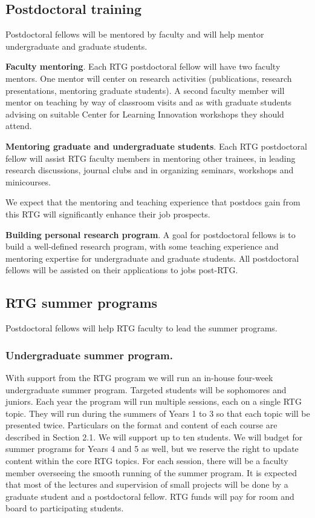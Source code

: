 \documentclass[11pt]{NSFamsart}
\begin{document}
\subsection{Postdoctoral training}
 Postdoctoral fellows will be mentored by faculty 
 and will help mentor undergraduate and graduate students. 


\noindent
\textbf{Faculty mentoring}. Each RTG postdoctoral fellow will have two faculty mentors. One mentor will center on research activities
(publications, research presentations, mentoring graduate students). A second faculty member will
mentor on teaching by way of classroom visits and as with graduate students advising on suitable Center for Learning Innovation workshops they should attend. 

\noindent
\textbf{Mentoring graduate  and undergraduate students}. Each RTG postdoctoral fellow will assist RTG faculty members in mentoring 
other trainees, in leading research discussions, journal clubs and
in organizing seminars, workshops and minicourses. 
 
We expect that the mentoring and teaching experience that postdocs gain from this RTG will significantly enhance their job prospects.   

 
 \noindent
\textbf{Building personal research program}. A goal for postdoctoral fellows is to   build a well-defined research program, with some teaching experience and mentoring expertise for undergraduate and graduate students.  All postdoctoral fellows will be assisted on their applications to jobs post-RTG.


\subsection{RTG summer programs}
 
Postdoctoral fellows will help RTG faculty to lead the   summer programs.

 \noindent
\subsubsection*{Undergraduate summer program.}
With support from the RTG program we will run an in-house four-week undergraduate summer program.
Targeted students will be sophomores and juniors. Each year the program will run multiple sessions, each on a single RTG topic. They will run during the summers of Years 1 to 3 so that each topic
will be presented twice. Particulars on the format and content of each course are described in Section 2.1.
We will support up to ten students. We will budget for summer programs for Years 4 and 5 as well, but we reserve
the right to update content within the core RTG topics. For each session, there will be a faculty member
  overseeing the smooth running of the summer program. It is expected that most of the lectures
and supervision of small projects will be done by a graduate student and a postdoctoral fellow. RTG funds
will pay for room and board to participating students.
\end{document}
